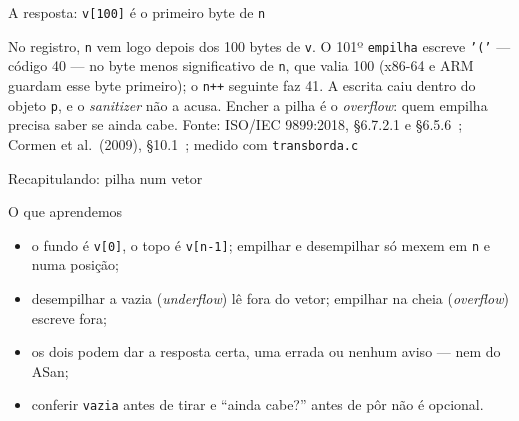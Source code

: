 \documentclass[aspectratio=169]{beamer}
\newcommand{\fonte}[1]{\vfill\hfill{\scriptsize\textcolor{UFSGray}{Fonte: #1}}}
\begin{document}
\begin{frame}{A resposta: \texttt{v[100]} é o primeiro byte de \texttt{n}}
  \begin{center}
  \end{center}
  \small
  No registro, \texttt{n} vem logo depois dos 100 bytes de \texttt{v}. O 101º
  \texttt{empilha} escreve \texttt{'('} --- código 40 --- no byte menos
  significativo de \texttt{n}, que valia 100 (x86-64 e ARM guardam esse byte
  primeiro); o \texttt{n++} seguinte faz 41. A escrita caiu dentro do objeto
  \texttt{p}, e o \emph{sanitizer} não a acusa. Encher a pilha é o \emph{overflow}: quem empilha precisa
  saber se ainda cabe.
  \fonte{ISO/IEC 9899:2018, §6.7.2.1 e §6.5.6~\cite{iso2018c17};
    Cormen et al.\ (2009), §10.1~\cite{cormen2009introduction}; medido com \texttt{transborda.c}}
\end{frame}

\begin{frame}{Recapitulando: pilha num vetor}
  \begin{block}{O que aprendemos}
    \begin{itemize}
      \item o fundo é \texttt{v[0]}, o topo é \texttt{v[n-1]}; empilhar e
        desempilhar só mexem em \texttt{n} e numa posição;
      \item desempilhar a vazia (\emph{underflow}) lê fora do vetor;
        empilhar na cheia (\emph{overflow}) escreve fora;
      \item os dois podem dar a resposta certa, uma errada ou nenhum aviso
        --- nem do ASan;
      \item conferir \texttt{vazia} antes de tirar e ``ainda cabe?'' antes de
        pôr não é opcional.
    \end{itemize}
  \end{block}
\end{frame}
\end{document}
